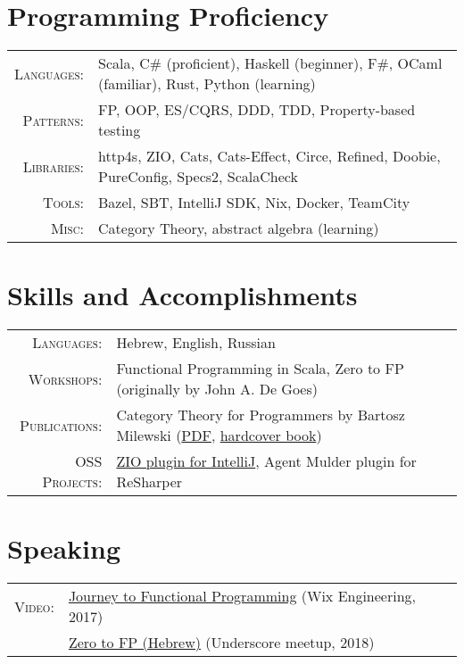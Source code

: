 \documentclass[a4paper,11pt]{article}
\begin{document}
\section{Programming Proficiency}
\begin{tabular}{rl}
  \textsc{Languages:}& Scala, C\# (proficient), Haskell (beginner), F\#, OCaml (familiar), Rust, Python (learning)\\
  \textsc{Patterns:}& FP, OOP, ES/CQRS, DDD, TDD, Property-based testing\\
  \textsc{Libraries:}& http4s, ZIO, Cats, Cats-Effect, Circe, Refined, Doobie, PureConfig, Specs2, ScalaCheck\\
  \textsc{Tools:}& Bazel, SBT, IntelliJ SDK, Nix, Docker, TeamCity\\
  \textsc{Misc:}& Category Theory, abstract algebra (learning)
\end{tabular}

\section{Skills and Accomplishments}
\begin{tabular}{rl}
  \textsc{Languages:}& Hebrew, English, Russian\\
  \textsc{Workshops:}& Functional Programming in Scala, Zero to FP (originally by John A. De Goes)\\
  \textsc{Publications:}& Category Theory for Programmers by Bartosz Milewski (\href{https://github.com/hmemcpy/milewski-ctfp-pdf}{PDF}, \href{https://www.blurb.com/b/9621951-category-theory-for-programmers-new-edition-hardco}{hardcover book})\\
  \textsc{OSS Projects:}& \href{https://github.com/zio/zio-intellij}{ZIO plugin for IntelliJ}, Agent Mulder plugin for ReSharper\\
\end{tabular}

\section{Speaking}
\begin{tabular}{rl}
  \textsc{Video:}&\href{https://www.youtube.com/watch?v=g1EvM4CbUvM}{Journey to Functional Programming} (Wix Engineering, 2017)\\
  &\href{https://www.youtube.com/watch?v=N6ZJwnvTjLA}{Zero to FP (Hebrew)} (Underscore meetup, 2018)\\
\end{tabular}
\end{document}
